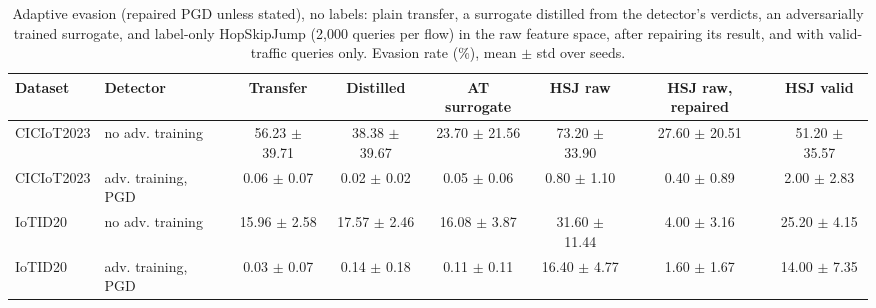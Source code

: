 \begin{table}[t]
\centering
\caption{Adaptive evasion (repaired PGD unless stated), no labels: plain transfer, a surrogate distilled from the detector's verdicts, an adversarially trained surrogate, and label-only HopSkipJump (2{,}000 queries per flow) in the raw feature space, after repairing its result, and with valid-traffic queries only. Evasion rate (\%), mean $\pm$ std over seeds.}
\label{tab:adaptive}
\footnotesize
\setlength{\tabcolsep}{3pt}
\begin{tabular}{llcccccc}
\toprule
Dataset & Detector & Transfer & Distilled & AT surrogate & HSJ raw & HSJ raw, repaired & HSJ valid \\
\midrule
CICIoT2023 & no adv. training & 56.23 $\pm$ 39.71 & 38.38 $\pm$ 39.67 & 23.70 $\pm$ 21.56 & 73.20 $\pm$ 33.90 & 27.60 $\pm$ 20.51 & 51.20 $\pm$ 35.57 \\
CICIoT2023 & adv. training, PGD & 0.06 $\pm$ 0.07 & 0.02 $\pm$ 0.02 & 0.05 $\pm$ 0.06 & 0.80 $\pm$ 1.10 & 0.40 $\pm$ 0.89 & 2.00 $\pm$ 2.83 \\
IoTID20 & no adv. training & 15.96 $\pm$ 2.58 & 17.57 $\pm$ 2.46 & 16.08 $\pm$ 3.87 & 31.60 $\pm$ 11.44 & 4.00 $\pm$ 3.16 & 25.20 $\pm$ 4.15 \\
IoTID20 & adv. training, PGD & 0.03 $\pm$ 0.07 & 0.14 $\pm$ 0.18 & 0.11 $\pm$ 0.11 & 16.40 $\pm$ 4.77 & 1.60 $\pm$ 1.67 & 14.00 $\pm$ 7.35 \\
\bottomrule
\end{tabular}
\end{table}
